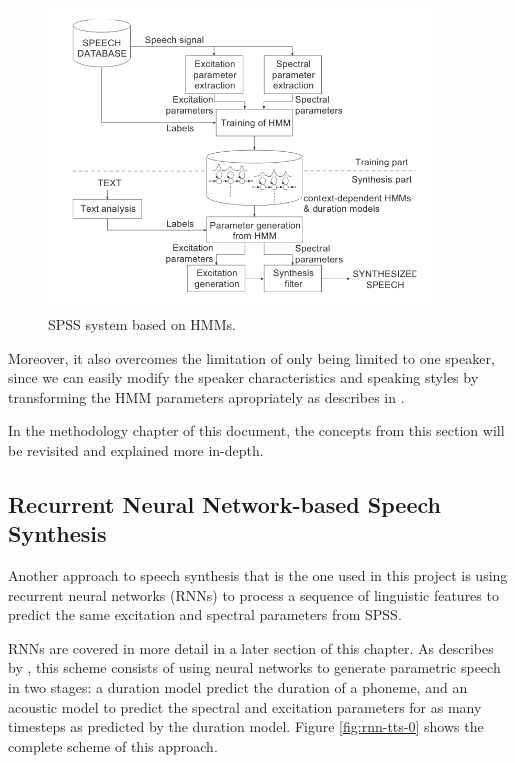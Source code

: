 \begin{figure}
    \centering
    \includegraphics[height=8cm]{figures/hts}
    \caption{SPSS system based on HMMs.}
    \label{fig:hts}
\end{figure}

Moreover, it also overcomes the limitation of only being limited to one speaker, since we can easily modify the speaker characteristics and speaking styles by transforming the HMM parameters apropriately as describes in \cite{zen2007hmm}. 

In the methodology chapter of this document, the concepts from this section will be revisited and explained more in-depth.

\subsection{Recurrent Neural Network-based Speech Synthesis}

Another approach to speech synthesis that is the one used in this project is using recurrent neural networks (RNNs) to process a sequence of linguistic features to predict the same excitation and spectral parameters from SPSS.

RNNs are covered in more detail in a later section of this chapter. As describes by \cite{chen1998rnn}, this scheme consists of using neural networks to generate parametric speech in two stages: a duration model predict the duration of a phoneme, and an acoustic model to predict the spectral and excitation parameters for as many timesteps as predicted by the duration model. Figure \ref{fig:rnn-tts-0} shows the complete scheme of this approach.

